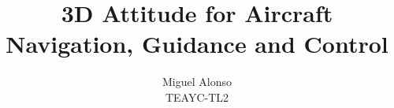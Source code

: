 \documentclass[12pt,a4paper]{report}
\begin{document}
\title{3D Attitude for Aircraft Navigation, Guidance and Control}
\author{Miguel Alonso \\ TEAYC-TL2}
\maketitle


\tableofcontents

\pagebreak




%








\end{document}
